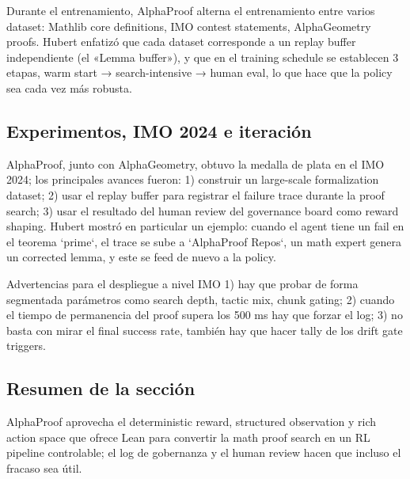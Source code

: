 Durante el entrenamiento, AlphaProof alterna el entrenamiento entre varios dataset: Mathlib core definitions, IMO contest statements, AlphaGeometry proofs. Hubert enfatizó que cada dataset corresponde a un replay buffer independiente (el «Lemma buffer»), y que en el training schedule se establecen 3 etapas, warm start → search-intensive → human eval, lo que hace que la policy sea cada vez más robusta.

\subsection{Experimentos, IMO 2024 e iteración}
AlphaProof, junto con AlphaGeometry, obtuvo la medalla de plata en el IMO 2024; los principales avances fueron: 1) construir un large-scale formalization dataset; 2) usar el replay buffer para registrar el failure trace durante la proof search; 3) usar el resultado del human review del governance board como reward shaping. Hubert mostró en particular un ejemplo: cuando el agent tiene un fail en el teorema `prime`, el trace se sube a `AlphaProof Repos`, un math expert genera un corrected lemma, y este se feed de nuevo a la policy.
\begin{warningbox}{Advertencias para el despliegue a nivel IMO}
1) hay que probar de forma segmentada parámetros como search depth, tactic mix, chunk gating; 2) cuando el tiempo de permanencia del proof supera los 500 ms hay que forzar el log; 3) no basta con mirar el final success rate, también hay que hacer tally de los drift gate triggers.
\end{warningbox}

\subsection{Resumen de la sección}
AlphaProof aprovecha el deterministic reward, structured observation y rich action space que ofrece Lean para convertir la math proof search en un RL pipeline controlable; el log de gobernanza y el human review hacen que incluso el fracaso sea útil.
\newpage

